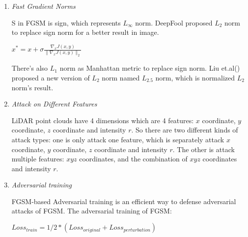 \begin{enumerate}
 \item \textit{Fast Gradient Norms}
 
 S in FGSM is sign, which represents  \(L_\infty\) norm. DeepFool\cite{moosavi-dezfooli_deepfool_2016} proposed  \(L_2\) norm to replace sign norm for a better result in image. 
 \begin{center}
          \(x^{*} =x+\sigma\frac{\nabla_{x}J(x,y)}{\|\nabla_{x}J(x,y)\|_{2}} \)
\end{center}
 There's also  \(L_1\) norm as Manhattan metric to replace sign norm. Liu et.al(\cite{liu_adversarial_2019}) proposed a new version of \(L_2\) norm named \(L_2.5\) norm, which is normalized \(L_2\) norm's result. 
 \item \textit{Attack on Different Features} 
 
 LiDAR point clouds have 4 dimensions which are 4 features: \(x\) coordinate, \(y\) coordinate, \(z\) coordinate and intensity \(r\). So there are two different kinds of attack types: one is only attack one feature, which is separately attack \(x\) coordinate, \(y\) coordinate, \(z\) coordinate and intensity \(r\). The other is attack multiple features: \(xyz\) coordinates, and the combination of \(xyz\) coordinates and intensity \(r\). 

\item\textit{Adversarial training}

FGSM-based Adversarial training is an efficient way to defense adversarial attacks of FGSM. The adversarial training of FGSM:
\begin{center}
          \(Loss_{train} = 1/2*(Loss_{original}+Loss_{perturbation}) \)
\end{center}

\end{enumerate}

